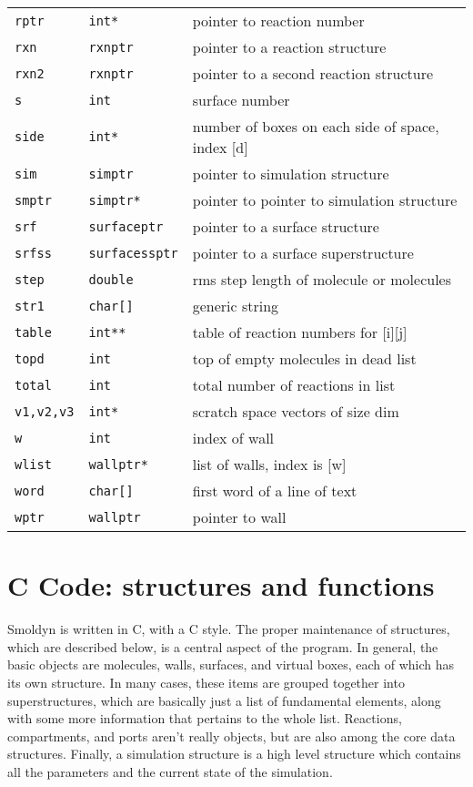 \documentclass {book}
\newcommand {\ttt} {\texttt}
\begin{document}
\begin{longtable}[c]{lll}
\ttt{rptr} & \ttt{int*} & pointer to reaction number\\
\ttt{rxn} & \ttt{rxnptr} & pointer to a reaction structure\\
\ttt{rxn2} & \ttt{rxnptr} & pointer to a second reaction structure\\
\ttt{s} & \ttt{int} & surface number\\
\ttt{side} & \ttt{int*} & number of boxes on each side of space, index [d]\\
\ttt{sim} & \ttt{simptr} & pointer to simulation structure\\
\ttt{smptr} & \ttt{simptr*} & pointer to pointer to simulation structure\\
\ttt{srf} & \ttt{surfaceptr} & pointer to a surface structure\\
\ttt{srfss} & \ttt{surfacessptr} & pointer to a surface superstructure\\
\ttt{step} & \ttt{double} & rms step length of molecule or molecules\\
\ttt{str1} & \ttt{char[]} & generic string\\
\ttt{table} & \ttt{int**} & table of reaction numbers for [i][j]\\
\ttt{topd} & \ttt{int} & top of empty molecules in dead list\\
\ttt{total} & \ttt{int} & total number of reactions in list\\
\ttt{v1,v2,v3} & \ttt{int*} & scratch space vectors of size dim\\
\ttt{w} & \ttt{int} & index of wall\\
\ttt{wlist} & \ttt{wallptr*} & list of walls, index is [w]\\
\ttt{word} & \ttt{char[]} & first word of a line of text\\
\ttt{wptr} & \ttt{wallptr} & pointer to wall\\
\end{longtable}

\chapter{C Code: structures and functions}

Smoldyn is written in C, with a C style. The proper maintenance of structures, which are described below, is a central aspect of the program. In general, the basic objects are molecules, walls, surfaces, and virtual boxes, each of which has its own structure. In many cases, these items are grouped together into superstructures, which are basically just a list of fundamental elements, along with some more information that pertains to the whole list. Reactions, compartments, and ports aren't really objects, but are also among the core data structures. Finally, a simulation structure is a high level structure which contains all the parameters and the current state of the simulation.
\end{document}
